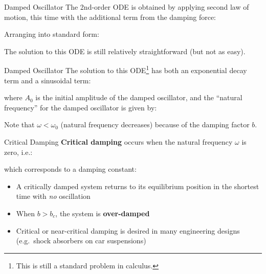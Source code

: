 \documentclass[12pt,compress,aspectratio=169]{beamer}
\begin{document}
\begin{frame}{Damped Oscillator}
  The 2nd-order ODE is obtained by applying second law of motion, this time
  with the additional term from the damping force:


  Arranging into standard form:
  

  The solution to this ODE is still relatively straightforward (but not as
  easy).
\end{frame}



\begin{frame}{Damped Oscillator}
  The solution to this ODE\footnote{This is still a standard problem in
    calculus.} has both an {\color{red}exponential decay term} and a
  {\color{blue}sinusoidal term}:


  \vspace{-.15in}where $A_0$ is the initial amplitude of the damped oscillator,
  and the ``natural frequency'' for the damped oscillator is given by:

  
  Note that $\omega<\omega_0$ (natural frequency decreases) because of the
  damping factor $b$.
  \vspace{.2in}
\end{frame}



\begin{frame}{Critical Damping}
  \textbf{Critical damping} occurs when the natural frequency $\omega$ is zero,
  i.e.:
  

  which corresponds to a damping constant:

  \begin{itemize}
  \item\vspace{-.1in}A critically damped system returns to its equilibrium
    position in the shortest time with \emph{no} oscillation
  \item When $b>b_c$, the system is \textbf{over-damped}
  \item Critical or near-critical damping is desired in many engineering designs
    (e.g.\ shock absorbers on car suspensions)
  \end{itemize}
\end{frame}
\end{document}
